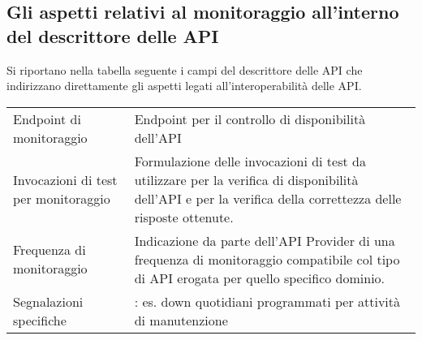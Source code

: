 \documentclass[letterpaper,10pt,italian]{sphinxmanual}
\begin{document}
\subsection{Gli aspetti relativi al monitoraggio all’interno del descrittore delle API}
\label{\detokenize{sez24:sezione241}}\label{\detokenize{sez24:gli-aspetti-relativi-al-monitoraggio-allinterno-del-descrittore-delle-api}}
Si riportano nella tabella seguente i campi del descrittore delle API che indirizzano direttamente gli aspetti legati all’interoperabilità delle API.


\begin{savenotes}\sphinxattablestart
\centering
{}
\label{\detokenize{sez24:id1}}
\sphinxaftercaption
\begin{tabulary}{\linewidth}[t]{|T|T|}
\hline
{}\relax &\relax \\
\hline
Endpoint di monitoraggio
&
Endpoint per il controllo di disponibilità dell’API
\\
\hline
Invocazioni di test per monitoraggio
&
Formulazione delle invocazioni di test da utilizzare per la verifica di disponibilità dell’API e per la verifica della correttezza delle risposte ottenute.
\\
\hline
Frequenza di monitoraggio
&
Indicazione da parte dell’API Provider di una frequenza di monitoraggio compatibile col tipo di API erogata per quello specifico dominio.
\\
\hline
Segnalazioni specifiche
&
: es. down quotidiani programmati per attività di manutenzione
\\
\hline
\end{tabulary}
\par
\sphinxattableend\end{savenotes}
\end{document}
